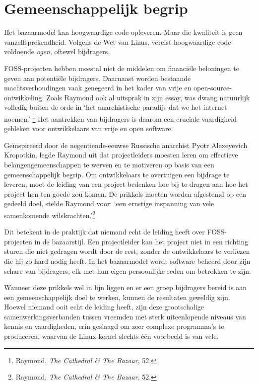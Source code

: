 \documentclass[
  a5paper,
  smalldemyvopaper,11pt,twoside,onecolumn,openright,extrafontsizes,
hidelinks]{memoir}
\begin{document}
\section{Gemeenschappelijk begrip}\label{gemeenschappelijk-begrip}

Het bazaarmodel kan hoogwaardige code opleveren. Maar die kwaliteit is
geen vanzelfsprekendheid. Volgens de Wet van Linus, vereist hoogwaardige
code voldoende \emph{ogen}, oftewel bijdragers.

FOSS-projecten hebben meestal niet de middelen om financiële beloningen
te geven aan potentiële bijdragers. Daarnaast worden bestaande
machtsverhoudingen vaak genegeerd in het kader van vrije en
open-source-ontwikkeling. Zoals Raymond ook al uitsprak in zijn essay,
was dwang natuurlijk volledig buiten de orde in `het anarchistische
paradijs dat we het internet noemen.' \footnote{\hspace{0pt}Raymond,
  \emph{The Cathedral \& The Bazaar}, 52.} Het aantrekken van bijdragers
is daarom een cruciale vaardigheid gebleken voor ontwikkelaars van vrije
en open software.

Geïnspireerd door de negentiende-eeuwse Russische anarchist Pyotr
Alexeyevich Kropotkin, legde Raymond uit dat projectleiders moesten
leren om effectieve belangengemeenschappen te werven en te motiveren op
basis van een gemeenschappelijk begrip. Om ontwikkelaars te overtuigen
een bijdrage te leveren, moet de leiding van een project bedenken hoe
bij te dragen aan hoe het project hen ten goede zou komen. De prikkels
moeten worden afgestemd op een gedeeld doel, stelde Raymond voor: `een
ernstige inspanning van vele samenkomende wilskrachten.'\footnote{\hspace{0pt}Raymond,
  \emph{The Cathedral \& The Bazaar}, 52.}

Dit betekent in de praktijk dat niemand echt de leiding heeft over
FOSS-projecten in de bazaarstijl. Een projectleider kan het project niet
in een richting sturen die niet gedragen wordt door de rest, zonder de
ontwikkelaars te verliezen die hij zo hard nodig heeft. In het
bazaarmodel wordt software beheerd door zijn schare van bijdragers, elk
met hun eigen persoonlijke reden om betrokken te zijn.

Wanneer deze prikkels wel in lijn liggen en er een groep bijdragers
bereid is aan een gemeenschappelijk doel te werken, kunnen de resultaten
geweldig zijn. Hoewel niemand ooit echt de leiding heeft, zijn deze
grootschalige samenwerkingsverbanden tussen vreemden met sterk
uiteenlopende niveaus van kennis en vaardigheden, erin geslaagd om zeer
complexe programma's te produceren, waarvan de Linux-kernel slechts één
voorbeeld is van vele.
\end{document}
